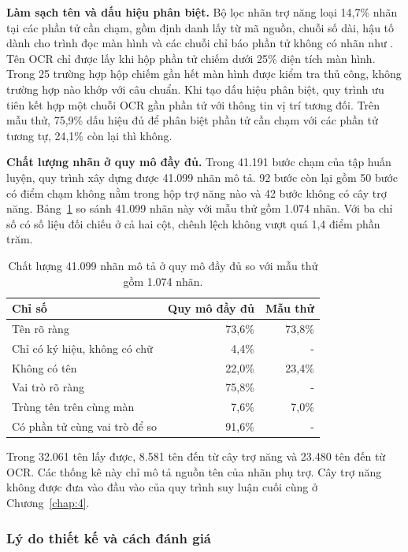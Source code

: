 \textbf{Làm sạch tên và dấu hiệu phân biệt.} Bộ lọc nhãn trợ năng loại 14,7\% nhãn tại các phần tử cần chạm, gồm định danh lấy từ mã nguồn, chuỗi số dài, hậu tố dành cho trình đọc màn hình và các chuỗi chỉ báo phần tử không có nhãn như . Tên OCR chỉ được lấy khi hộp phần tử chiếm dưới 25\% diện tích màn hình. Trong 25 trường hợp hộp chiếm gần hết màn hình được kiểm tra thủ công, không trường hợp nào khớp với câu chuẩn. Khi tạo dấu hiệu phân biệt, quy trình ưu tiên kết hợp một chuỗi OCR gần phần tử với thông tin vị trí tương đối. Trên mẫu thử, 75,9\% dấu hiệu đủ để phân biệt phần tử cần chạm với các phần tử tương tự, 24,1\% còn lại thì không.

\textbf{Chất lượng nhãn ở quy mô đầy đủ.} Trong 41.191 bước chạm của tập huấn luyện, quy trình xây dựng được 41.099 nhãn mô tả. 92 bước còn lại gồm 50 bước có điểm chạm không nằm trong hộp trợ năng nào và 42 bước không có cây trợ năng. Bảng~\ref{tab:A.desc_quality} so sánh 41.099 nhãn này với mẫu thử gồm 1.074 nhãn. Với ba chỉ số có số liệu đối chiếu ở cả hai cột, chênh lệch không vượt quá 1,4 điểm phần trăm.

\begin{table}[htbp]
\centering\small
\caption[Chất lượng nhãn mô tả ở quy mô đầy đủ so với mẫu thử.]{Chất lượng 41.099 nhãn mô tả ở quy mô đầy đủ so với mẫu thử gồm 1.074 nhãn.}\label{tab:A.desc_quality}
\begin{tabular}{@{}lrr@{}}
\toprule
\textbf{Chỉ số} & \textbf{Quy mô đầy đủ} & \textbf{Mẫu thử} \\
\midrule
Tên rõ ràng & 73,6\% & 73,8\% \\
Chỉ có ký hiệu, không có chữ & 4,4\% & - \\
Không có tên & 22,0\% & 23,4\% \\
Vai trò rõ ràng & 75,8\% & - \\
Trùng tên trên cùng màn & 7,6\% & 7,0\% \\
Có phần tử cùng vai trò để so & 91,6\% & - \\
\bottomrule
\end{tabular}
\end{table}

Trong 32.061 tên lấy được, 8.581 tên đến từ cây trợ năng và 23.480 tên đến từ OCR. Các thống kê này chỉ mô tả nguồn tên của nhãn phụ trợ. Cây trợ năng không được đưa vào đầu vào của quy trình suy luận cuối cùng ở Chương~\ref{chap:4}.

\subsubsection{Lý do thiết kế và cách đánh giá}

